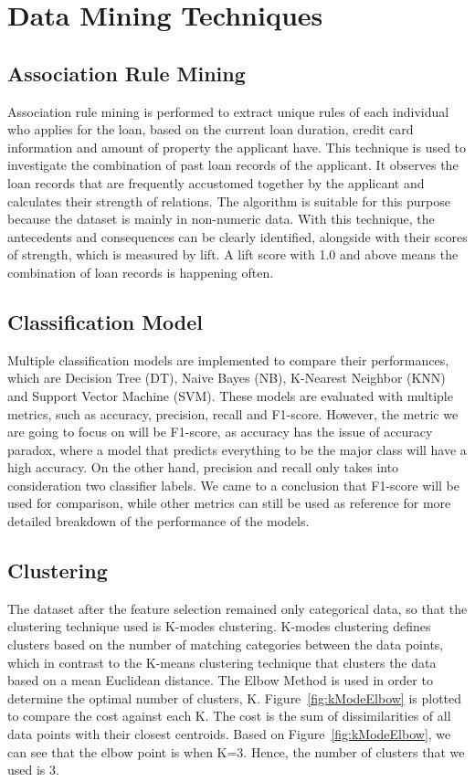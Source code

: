 \documentclass[11pt]{article}
\begin{document}
\clearpage
\section{Data Mining Techniques}
\subsection{Association Rule Mining}
Association rule mining is performed to extract unique rules of each individual who applies for the loan, based on the current loan duration, credit card information and amount of property the applicant have. This technique is used to investigate the combination of past loan records of the applicant. It observes the loan records that are frequently accustomed together by the applicant and calculates their strength of relations. The algorithm is suitable for this purpose because the dataset is mainly in non-numeric data. With this technique, the antecedents and consequences can be clearly identified, alongside with their scores of strength, which is measured by lift. A lift score with 1.0 and above means the combination of loan records is happening often. 

\subsection{Classification Model}
Multiple classification models are implemented to compare their performances, which are Decision Tree (DT), Naive Bayes (NB), K-Nearest Neighbor (KNN) and Support Vector Machine (SVM). These models are evaluated with multiple metrics, such as accuracy, precision, recall and F1-score. However, the metric we are going to focus on will be F1-score, as accuracy has the issue of accuracy paradox, where a model that predicts everything to be the major class will have a high accuracy. On the other hand, precision and recall only takes into consideration two classifier labels. We came to a conclusion that F1-score will be used for comparison, while other metrics can still be used as reference for more detailed breakdown of the performance of the models. 

\clearpage
\subsection{Clustering}
The dataset after the feature selection remained only categorical data, so that the clustering technique used is K-modes clustering. K-modes clustering defines clusters based on the number of matching categories between the data points, which in contrast to the K-means clustering technique that clusters the data based on a mean Euclidean distance. The Elbow Method is used in order to determine the optimal number of clusters, K. Figure~\ref{fig:kModeElbow} is plotted to compare the cost against each K. The cost is the sum of dissimilarities of all data points with their closest centroids. Based on Figure~\ref{fig:kModeElbow}, we can see that the elbow point is when K=3. Hence, the number of clusters that we used is 3.
\end{document}
